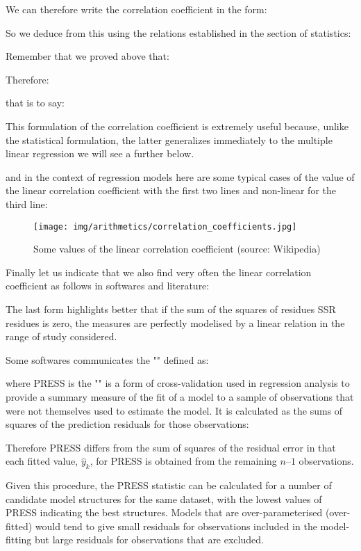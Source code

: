 	We can therefore write the correlation coefficient in the form:
	
	So we deduce from this using the relations established in the section of statistics:
	
	Remember that we proved above that:
	
	Therefore:
	
	that is to say:
	
	\begin{tcolorbox}[title=Remark,colframe=black,arc=10pt]
This formulation of the correlation coefficient is extremely useful because, unlike the statistical formulation, the latter generalizes immediately to the multiple linear regression we will see a further below.
	\end{tcolorbox}
	and in the context of regression models here are some typical cases of the value of the linear correlation coefficient with the first two lines and non-linear for the third line:
\begin{figure}[H]
\centering
\texttt{[image: img/arithmetics/correlation\_coefficients.jpg]}
\caption[Some values of the linear correlation coefficient]{Some values of the linear correlation coefficient (source: Wikipedia)}
\end{figure}
	Finally let us indicate that we also find very often the linear correlation coefficient as follows in softwares and literature:
	
	The last form highlights better that if the sum of the squares of residues SSR  residues is zero, the measures are perfectly modelised by a linear relation in the range of study considered.
	
	\begin{tcolorbox}[title=Remark,colframe=black,arc=10pt]
	Some softwares communicates the "" defined as:
	
	 where PRESS is the "" is a form of cross-validation used in regression analysis to provide a summary measure of the fit of a model to a sample of observations that were not themselves used to estimate the model. It is calculated as the sums of squares of the prediction residuals for those observations:
	 
	Therefore PRESS differs from the sum of squares of the residual error in that each fitted value, $\hat{y}_k$, for PRESS is obtained from the remaining $n – 1$ observations.
	
	Given this procedure, the PRESS statistic can be calculated for a number of candidate model structures for the same dataset, with the lowest values of PRESS indicating the best structures. Models that are over-parameterised (over-fitted) would tend to give small residuals for observations included in the model-fitting but large residuals for observations that are excluded.
	\end{tcolorbox}
	
